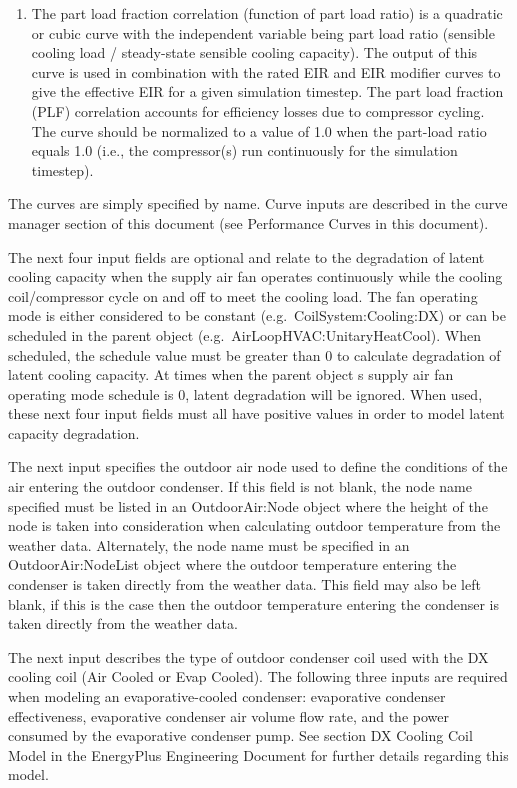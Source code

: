 \begin{enumerate}
\item
  The part load fraction correlation (function of part load ratio) is a quadratic or cubic curve with the independent variable being part load ratio (sensible cooling load / steady-state sensible cooling capacity). The output of this curve is used in combination with the rated EIR and EIR modifier curves to give the effective EIR for a given simulation timestep. The part load fraction (PLF) correlation accounts for efficiency losses due to compressor cycling. The curve should be normalized to a value of 1.0 when the part-load ratio equals 1.0 (i.e., the compressor(s) run continuously for the simulation timestep).
\end{enumerate}

The curves are simply specified by name. Curve inputs are described in the curve manager section of this document (see Performance Curves in this document).

The next four input fields are optional and relate to the degradation of latent cooling capacity when the supply air fan operates continuously while the cooling coil/compressor cycle on and off to meet the cooling load. The fan operating mode is either considered to be constant (e.g.~CoilSystem:Cooling:DX) or can be scheduled in the parent object (e.g.~AirLoopHVAC:UnitaryHeatCool). When scheduled, the schedule value must be greater than 0 to calculate degradation of latent cooling capacity. At times when the parent object s supply air fan operating mode schedule is 0, latent degradation will be ignored. When used, these next four input fields must all have positive values in order to model latent capacity degradation.

The next input specifies the outdoor air node used to define the conditions of the air entering the outdoor condenser. If this field is not blank, the node name specified must be listed in an OutdoorAir:Node object where the height of the node is taken into consideration when calculating outdoor temperature from the weather data. Alternately, the node name must be specified in an OutdoorAir:NodeList object where the outdoor temperature entering the condenser is taken directly from the weather data. This field may also be left blank, if this is the case then the outdoor temperature entering the condenser is taken directly from the weather data.

The next input describes the type of outdoor condenser coil used with the DX cooling coil (Air Cooled or Evap Cooled). The following three inputs are required when modeling an evaporative-cooled condenser: evaporative condenser effectiveness, evaporative condenser air volume flow rate, and the power consumed by the evaporative condenser pump. See section DX Cooling Coil Model in the EnergyPlus Engineering Document for further details regarding this model.


